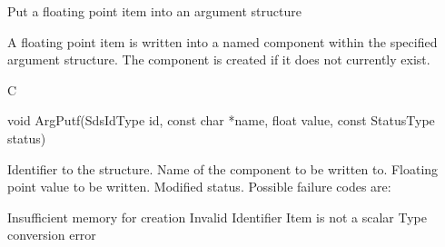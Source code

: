 \begin{manroutinedescription}
      Put a floating point item into an argument structure

      A floating point item is written into a named component within the
      specified argument structure. The component is created if it
      does not currently exist.
 
      C

      void ArgPutf(SdsIdType id, const char *name, float value, const %
StatusType {\mantt{*}} status)
 
\begin{manparametertable}
 Identifier to the structure.
 Name of the component to be %
written to.
 Floating point value to be %
written.
 Modified status. Possible %
failure codes are:
\end{manparametertable}
\begin{mantwocolumntable}
Insufficient memory for creation
Invalid Identifier
Item is not a scalar
Type conversion error
\end{mantwocolumntable}
\end{manroutinedescription}
